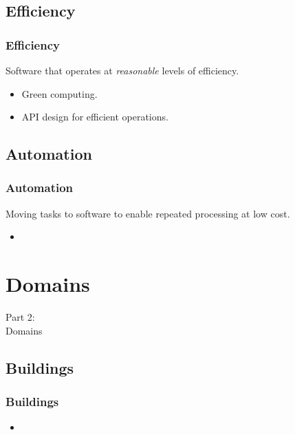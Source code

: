 \subsection{Efficiency}
\begin{frame}
    \frametitle{Efficiency}
    \vspace{0mm}
    Software that operates at \textsl{reasonable} levels of efficiency.
    \vspace{3mm}
    \begin{itemize}
        \item Green computing.
        \item API design for efficient operations.
    \end{itemize}
\end{frame}

\subsection{Automation}
\begin{frame}
    \frametitle{Automation}
    \vspace{0mm}
    Moving tasks to software to enable repeated processing at low cost.
    \vspace{3mm}
    \begin{itemize}
        \item 
    \end{itemize}
\end{frame}

\section{Domains}
\begin{frame}
    \vspace{25mm}
    \begin{center}
        \Huge{Part 2:\\Domains}
    \end{center}
\end{frame}

\subsection{Buildings}
\begin{frame}
    \frametitle{Buildings}
    \vspace{3mm}
    \begin{itemize}
        \item
    \end{itemize}
\end{frame}

